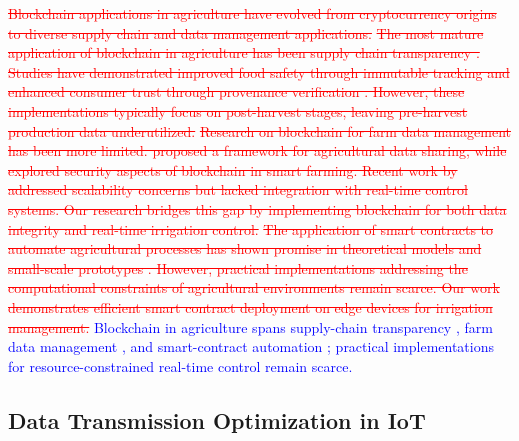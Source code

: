 \documentclass[pdflatex,sn-mathphys-num]{sn-jnl}
\theoremstyle{thmstyleone}
\theoremstyle{thmstyletwo}
\theoremstyle{thmstylethree}
\begin{document}
{\textcolor{red}{\sout{Blockchain applications in agriculture have evolved from cryptocurrency origins to diverse supply chain and data management applications.}}
\textcolor{red}{\sout{The most mature application of blockchain in agriculture has been supply chain transparency . Studies have demonstrated improved food safety through immutable tracking and enhanced consumer trust through provenance verification . However, these implementations typically focus on post-harvest stages, leaving pre-harvest production data underutilized.}}
\textcolor{red}{\sout{Research on blockchain for farm data management has been more limited. proposed a framework for agricultural data sharing, while explored security aspects of blockchain in smart farming. Recent work by addressed scalability concerns but lacked integration with real-time control systems. Our research bridges this gap by implementing blockchain for both data integrity and real-time irrigation control.}}
\textcolor{red}{\sout{The application of smart contracts to automate agricultural processes has shown promise in theoretical models and small-scale prototypes . However, practical implementations addressing the computational constraints of agricultural environments remain scarce. Our work demonstrates efficient smart contract deployment on edge devices for irrigation management.}}
\textcolor{blue}{Blockchain in agriculture spans supply-chain transparency \cite{tian2016agri, kamilaris2019rise, oh2025foodsafety, galvez2018future}, farm data management \cite{lin2018blockchain, ferrag2020security, haque2024scalable}, and smart-contract automation \cite{rama2021systematic, patil2022blockchain}; practical implementations for resource-constrained real-time control remain scarce.}

\subsection{Data Transmission Optimization in IoT}
\label{subsec:data_transmission}

}
\end{document}
